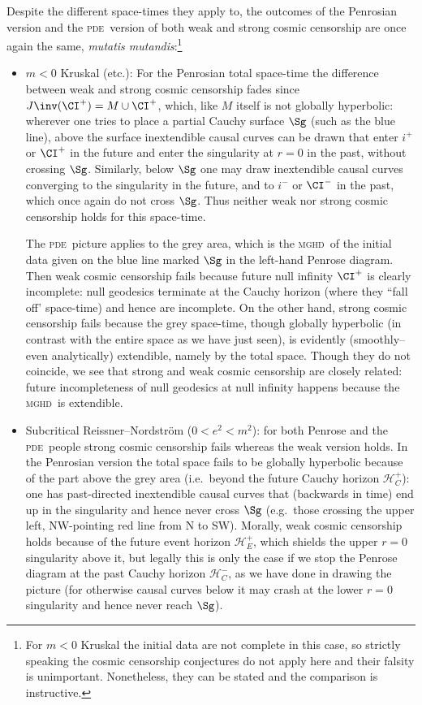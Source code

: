 \documentclass[12pt]{article}
\newcommand{\mghd}{\textsc{mghd}}
\newcommand{\pde}{\textsc{pde}}
\begin{document}
\medskip
\noindent Despite the different space-times they apply to, the outcomes of the Penrosian version and the \pde\ version of both weak and strong cosmic censorship are once again the same, \emph{mutatis mutandis}:\footnote{For $m<0$ Kruskal the initial data are not complete in this case, so strictly speaking the cosmic censorship conjectures do not apply here and their falsity is unimportant. Nonetheless, they can be stated and the comparison is instructive.} 
\begin{itemize}
\item  $m<0$ Kruskal (etc.): For the Penrosian total space-time the difference between weak and strong  cosmic censorship  fades since
 $J\inv(\CI^+)=M\cup\CI^+$, which, like $M$ itself is not globally hyperbolic: wherever one tries to place a partial Cauchy surface $\Sg$ (such as the blue line), above the surface  inextendible causal curves can be drawn that enter $i^+$ or $\CI^+$ in the future and enter the singularity at $r=0$ in the past, without  crossing $\Sg$. Similarly, below $\Sg$ one may draw  inextendible causal curves converging to the
 singularity in the future, and to  $i^-$ or $\CI^-$ in the past, which once again do not cross $\Sg$. Thus neither weak nor strong cosmic censorship  holds for this space-time.
 
The \pde\ picture applies to the grey area, which is the \mghd\ of the initial data given on the blue line marked $\Sg$  in the left-hand Penrose diagram. Then
 weak cosmic censorship fails because future null infinity $\CI^+$ is clearly incomplete: null geodesics terminate at the Cauchy horizon (where they ``fall off' space-time) and hence are incomplete. On the other hand, strong cosmic censorship fails because the grey space-time, though globally hyperbolic (in contrast with the entire space as we have just seen), is evidently (smoothly--even analytically) extendible, namely by the total space.  Though they do not coincide, we see  that strong and weak cosmic censorship are closely related: future incompleteness of null geodesics at null infinity 
happens because the \mghd\ is extendible.
 
 \item  Subcritical Reissner--Nordstr\"{o}m  ($0<e^2<m^2$):  for both Penrose and the \pde\ people strong cosmic censorship fails whereas the weak version holds.
  In the Penrosian version the total space  fails to be globally hyperbolic because of the part above the grey area (i.e.\ beyond the future Cauchy horizon $\mathcal{H}_C^+$): one has past-directed inextendible causal curves that (backwards in time) end up in the singularity and hence never cross $\Sg$ (e.g.\ those crossing the upper left, NW-pointing red line from N to SW). 
  Morally, weak  cosmic censorship  holds because of the future event horizon $\mathcal{H}_E^+$, which shields the upper $r=0$ singularity above it, 
  but legally this is only the case if we stop the Penrose diagram at the past Cauchy horizon $\mathcal{H}_C^-$, as we have  done in drawing the picture (for otherwise causal curves below it may crash at the  lower $r=0$ singularity and hence never reach $\Sg$). 
  

\end{itemize}
\end{document}
